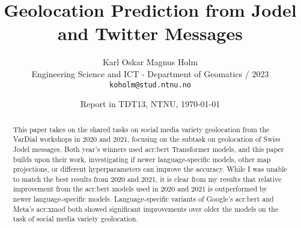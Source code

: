 \documentclass[11pt]{article}
\title{Geolocation Prediction from Jodel and Twitter Messages}
\author{Karl Oskar Magnus Holm \\
  Engineering Science and ICT - Department of Geomatics / 2023 \\
  {\tt koholm@stud.ntnu.no} \\}
\date{Report in TDT13, NTNU, \today}
\begin{document}
\maketitle


\begin{abstract}
    \begin{comment}
    This paper provides a template for writing a Project Report in TDT13, Advanced Text Analytics and Language Understanding.
    The document itself conforms to its own specifications and is thus an example of what your manuscript should look like.
    The template does not form a compulsory style that you are obliged to use, but rather provides a common starting point for all students.
    For a given report, tuning of the template may still be required, depending on the nature of the report and the author's writing style.
    Such tuning might involve moving a section to a subsection or vice versa, or removing or adding sections and subsections.

    Note that the template contains a lot of examples of how to write different parts of the report
    as well as how to cite authors and how to use LaTeX and BibTeX.
    Some of those examples might only be clear if you actually look at the LaTeX source itself.

    The abstract is your sales pitch which encourages people to read your work,
    but unlike sales it should be realistic with respect to the contributions of the work.
    It should include:
    \begin{itemize}
        \item what the research topic is,
        \item the research approach(es) applied, and
        \item contributions.
    \end{itemize}

    The abstract should not exceed 200 words.
    Do not include lists, tables or figures.
    Avoid abbreviations and references.
    \end{comment}

    This paper takes on the shared tasks on social media variety geolocation from the VarDial workshops in 2020 and 2021, focusing on the subtask on geolocation of Swiss Jodel messages. Both year's winners used \acrshort{acr:bert} Transformer models, and this paper builds upon their work, investigating if newer language-specific models, other map projections, or different hyperparameters can improve the accuracy. While I was unable to match the best results from 2020 and 2021, it is clear from my results that relative improvement from the \acrshort{acr:bert} models used in 2020 and 2021 is outperformed by newer language-specific models. Language-specific variants of Google's \acrshort{acr:bert} and Meta's \acrshort{acr:xmod} both showed significant improvements over older the models on the task of social media variety geolocation.
\end{abstract}
\end{document}
